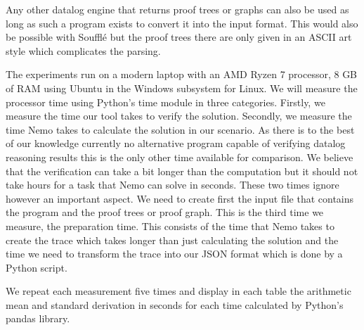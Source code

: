 Any other datalog engine that returns proof trees or graphs can also be used as long as such a program exists to convert it into the input format. This would also be possible with Soufflé\cite{Souffle} but the proof trees there are only given in an ASCII art style which complicates the parsing.

The experiments run on a modern laptop with an AMD Ryzen 7 processor, 8 GB of RAM using Ubuntu in the Windows subsystem for Linux.
We will measure the processor time using Python's time module in three categories. Firstly, we measure the time our tool takes to verify the solution. Secondly, we measure the time Nemo takes to calculate the solution in our scenario. As there is to the best of our knowledge currently no alternative program capable of verifying datalog reasoning results this is the only other time available for comparison. We believe that the verification can take a bit longer than the computation but it should not take hours for a task that Nemo can solve in seconds. 
These two times ignore however an important aspect. We need to create first the input file that contains the program and the proof trees or proof graph. This is the third time we measure, the preparation time. This consists of the time that Nemo takes to create the trace which takes longer than just calculating the solution and the time we need to transform the trace into our JSON format which is done by a Python script.

We repeat each measurement five times and display in each table the arithmetic mean and standard derivation in seconds for each time calculated by Python's pandas library.


